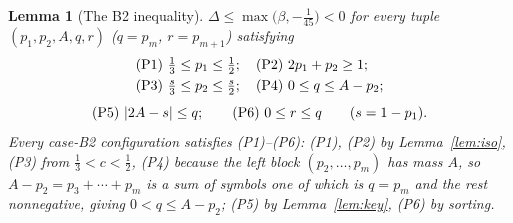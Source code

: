 \documentclass[journal]{IEEEtran}
\newtheorem{lemma}{Lemma}
\theoremstyle{definition}
\begin{document}
\begin{lemma}[The B2 inequality]\label{lem:B2}
$\Delta\le\max\bigl(\beta,-\tfrac1{45}\bigr)<0$ for
every tuple $(p_1,p_2,A,q,r)$
\textup{(}$q=p_m$, $r=p_{m+1}$\textup{)} satisfying
\[
\begin{aligned}
  &\textup{(P1) }\tfrac13\le p_1\le\tfrac12;\quad
  \textup{(P2) }2p_1+p_2\ge1;\\
  &\textup{(P3) }\tfrac s3\le p_2\le\tfrac s2;\quad
  \textup{(P4) }0\le q\le A-p_2;
\end{aligned}
\]
\[
  \textup{(P5) }|2A-s|\le q;\qquad
  \textup{(P6) }0\le r\le q\qquad (s=1-p_1).
\]
Every case-\textup{B2} configuration satisfies \textup{(P1)--(P6)}: \textup{(P1),
(P2)} by Lemma~\ref{lem:iso}, \textup{(P3)} from $\tfrac13<c<\tfrac12$,
\textup{(P4)} because the left block $(p_2,\dots,p_m)$ has mass $A$, so $A-p_2=p_3+\cdots+p_m$ is a sum of symbols one of which is $q=p_m$ and the rest nonnegative, giving $0<q\le A-p_2$; \textup{(P5)} by
Lemma~\ref{lem:key}, \textup{(P6)} by sorting.
\end{lemma}
\end{document}
